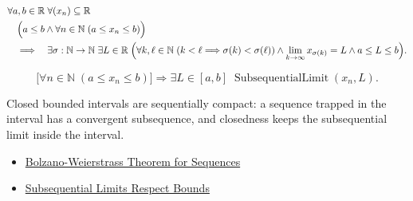\begin{remark*}
\[
\begin{aligned}
&\forall a,b\in\mathbb{R}\;\forall (x_n)\subseteq\mathbb{R}\\
&\quad\Bigl(
  a\le b
  \land
  \forall n\in\mathbb{N}\;(a\le x_n\le b)
\Bigr)\\
&\quad\Longrightarrow\quad
\exists \sigma:\mathbb{N}\to\mathbb{N}\;\exists L\in\mathbb{R}\;
\Bigl(
  \forall k,\ell\in\mathbb{N}\;(k<\ell\Longrightarrow\sigma(k)<\sigma(\ell))
  \land
  \lim_{k\to\infty}x_{\sigma(k)}=L
  \land
  a\le L\le b
\Bigr).
\end{aligned}
\]
\end{remark*}

\begin{remark*}
\[
\bigl[\forall n\in\mathbb{N}\;(a\le x_n\le b)\bigr]
\Longrightarrow
\exists L\in[a,b]\;\operatorname{SubsequentialLimit}(x_n,L).
\]
\end{remark*}

\begin{remark*}[Interpretation]
Closed bounded intervals are sequentially compact: a sequence trapped in the
interval has a convergent subsequence, and closedness keeps the subsequential
limit inside the interval.
\end{remark*}

\begin{dependencies}
\begin{itemize}
  \item \hyperref[thm:bolzano-weierstrass-sequences]{Bolzano-Weierstrass Theorem for Sequences}
  \item \hyperref[thm:subsequential-limits-respect-bounds]{Subsequential Limits Respect Bounds}
\end{itemize}
\end{dependencies}
